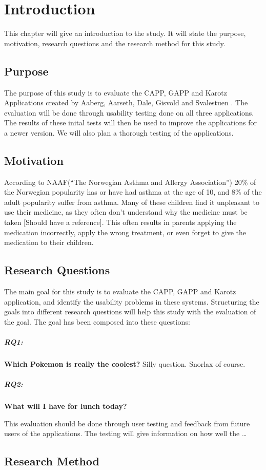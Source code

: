 \chapter{Introduction}
\label{introduction}

This chapter will give an introduction to the study. It will state the purpose, motivation, research questions and the research method for this study. 

\section{Purpose}
\label{purpose}
The purpose of this study is to evaluate the CAPP, GAPP and Karotz Applications created by Aaberg, Aarseth, Dale, Gisvold and Svalestuen \cite{CustomerDriven}.
The evaluation will be done through usability testing done on all three applications. The results of these inital tests will then be used to improve the applications for a newer version. 
We will also plan a thorough testing of the applications.


\section{Motivation}
\label{motivation}
According to NAAF(``The Norwegian Asthma and Allergy Association'') 20\% of the Norwegian popularity has or have had asthma at the age of 10, and 8\% of the adult popularity suffer from asthma. Many of these children find it unpleasant to use their medicine, as they often don't understand why the medicine must be taken [Should have a reference]. This often results in parents applying the medication incorrectly, apply the wrong treatment, or even forget to give the medication to their children. 


\section{Research Questions}
\label{reseachquestions}
The main goal for this study is to evaluate the CAPP, GAPP and Karotz application, and identify the usability problems in these systems. Structuring the goals into different research questions will help this study with the evaluation of the goal. The goal has been composed into these questions:

\paragraph{RQ1:}
\textbf{Which Pokemon is really the coolest?}
Silly question. Snorlax of course. 

\paragraph{RQ2:}
\textbf{What will I have for lunch today?}

This evaluation should be done through user testing and feedback from future users of the applications. The testing will give information on how well the 
\ldots

\section{Research Method}
\label{researchmethod}


